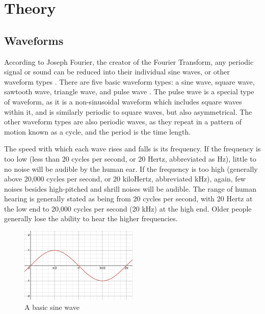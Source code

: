 \chapter[Theory]{Theory}\label{chapter:theory}

\section{Waveforms}\label{section:waveforms}
According to Joseph Fourier, the creator of the Fourier Transform, any periodic signal or sound can be reduced into their individual sine waves, or other waveform types \cite{Broughton_Bryan_2008}. There are five basic waveform types: a sine wave, square wave, sawtooth wave, triangle wave, and pulse wave \cite{Winer_2018}. The pulse wave is a special type of waveform, as it is a non-sinusoidal waveform which includes square waves within it, and is similarly periodic to square waves, but also asymmetrical. The other waveform types are also periodic waves, as they repeat in a pattern of motion known as a cycle, and the period is the time length.

The speed with which each wave rises and falls is its frequency. If the frequency is too low (less than 20 cycles per second, or 20 Hertz, abbreviated as Hz), little to no noise will be audible by the human ear. If the frequency is too high (generally above 20,000 cycles per second, or 20 kiloHertz, abbreviated kHz), again, few noises besides high-pitched and shrill noises will be audible. The range of human hearing is generally stated as being from 20 cycles per second, with 20 Hertz at the low end to 20,000 cycles per second (20 kHz) at the high end. Older people generally lose the ability to hear the higher frequencies.

\begin{figure}
	\centering
	\includegraphics[width=0.5\textwidth]{figures/sine-wave-form.png}
	\caption{A basic sine wave}
	\label{fig:basic-sine-wave}
\end{figure}

